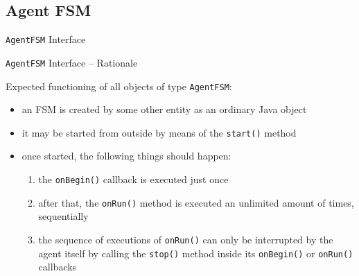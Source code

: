 \documentclass[presentation]{beamer}\mode<presentation>{\usetheme{AMSCesenaPurpleAndGold}}
\begin{document}
\subsection{Agent FSM}

\begin{frame}[allowframebreaks]{\texttt{AgentFSM} Interface}
    
    
    
\end{frame}

\begin{frame}[allowframebreaks]{\texttt{AgentFSM} Interface -- Rationale}
    
        
    
    Expected functioning of all objects of type \alert{\texttt{AgentFSM}}:
    \bigskip
    \begin{itemize}
        \item an FSM is created by some other entity as an ordinary Java object
        
        \bigskip
        
        \item it may be started from outside by means of the \texttt{\alert{start()}} method 
        
        \bigskip
        
        \item once started, the following things should happen:
        \begin{enumerate}
            \item the \texttt{\alert{onBegin()}} callback is executed \alert{just once}
            
            \item \alert{after} that, the \texttt{\alert{onRun()}} method is executed an \alert{unlimited} amount of times, sequentially
    
            \item the sequence of executions of \texttt{onRun()} can only be interrupted by the agent itself by calling the \texttt{\alert{stop()}} method inside its \texttt{onBegin()} or \texttt{onRun()} callbacks
        \end{enumerate}
        

\end{itemize}
\end{frame}
\end{document}
